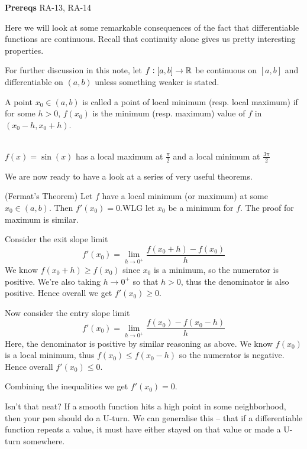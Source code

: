 

\textbf{Prereqs} RA-13, RA-14

Here we will look at some remarkable consequences of the fact that differentiable functions are continuous. Recall that continuity alone gives us pretty interesting properties.

For further discussion in this note, let $f: [a, b] \rightarrow \mathbb{R}$ be continuous on $[a, b]$ and differentiable on $(a, b)$ unless something weaker is stated.

\begin{SNP}{\dfn}A point $x_0 \in (a, b)$ is called a point of local minimum (resp. local maximum) if for some $h > 0$, $f(x_0)$ is the minimum (resp. maximum) value of $f$ in $(x_0 - h, x_0 + h)$.
\end{SNP}

\begin{center}
\\
$f(x) = \sin(x)$ has a local maximum at $\frac \pi 2$ and a local minimum at $\frac {3\pi} 2$
\end{center}
We are now ready to have a look at a series of very useful theorems.
\begin{SWP}{\thm}{(Fermat's Theorem) Let $f$ have a local minimum (or maximum) at some $x_0 \in (a, b)$. Then $f'(x_0) = 0$.}WLG let $x_0$ be a minimum for $f$. The proof for maximum is similar.

Consider the exit slope limit
$$
f'(x_0) = \lim_{h \rightarrow 0^+}\frac{f(x_0 + h) - f(x_0)}{h}
$$
We know $f(x_0 + h) \geq f(x_0)$ since $x_0$ is a minimum, so the numerator is positive. We're also taking $h \rightarrow 0^+$ so that $h > 0$, thus the denominator is also positive. Hence overall we get $f'(x_0) \geq 0$.

Now consider the entry slope limit
$$
f'(x_0) = \lim_{h \rightarrow 0^+}\frac{f(x_0) - f(x_0 - h)}{h}
$$
Here, the denominator is positive by similar reasoning as above. We know $f(x_0)$ is a local minimum, thus $f(x_0) \leq f(x_0 - h)$ so the numerator is negative. Hence overall $f'(x_0) \leq 0$.

Combining the inequalities we get $f'(x_0) = 0$.
\end{SWP}
Isn't that neat? If a smooth function hits a high point in some neighborhood, then your pen should do a U-turn. We can generalise this -- that if a differentiable function repeats a value, it must have either stayed on that value or made a U-turn somewhere.

